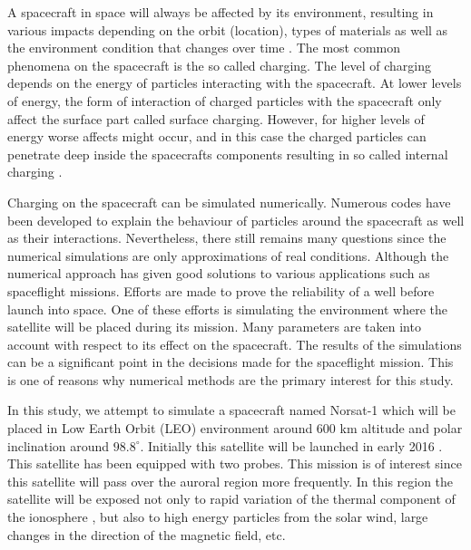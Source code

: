 

A spacecraft in space will always be affected by its environment, resulting in various
impacts depending on the orbit (location), types of materials as well as the environment
condition that changes over time \citep{trove.nla.gov.au/work/21680840}. The  most common phenomena on the spacecraft is the so
called charging. The level of charging depends on the energy of particles interacting with
the spacecraft. At lower levels of energy, the form of interaction of charged particles with the
spacecraft only affect the surface part called surface charging. However, for higher levels of energy
worse affects might occur, and in this case the charged particles
can penetrate deep inside the spacecrafts components resulting in so called internal charging \citep{fennell2001spacecraft}.

Charging on the spacecraft can be simulated numerically. Numerous codes have been developed
to explain the behaviour of particles around the spacecraft as well as their interactions.
Nevertheless, there still remains many questions since the numerical simulations are only approximations
of real conditions. Although the numerical approach has given good solutions to various applications
such as spaceflight missions. Efforts are made to prove the reliability of a well before launch into space.
One of these efforts is simulating the environment where the satellite will be placed during its mission.
Many parameters are taken into account with respect to its effect on the spacecraft.
The results of the simulations can be a significant point in the decisions made for the spaceflight
mission. This is one of reasons why numerical methods are the primary interest for this study.

In this study, we attempt to simulate a spacecraft named Norsat-1 which will be placed in
Low Earth Orbit (LEO) environment around 600 km altitude and polar inclination around \(98.8^\circ\).
Initially this satellite will be launched in early 2016
\citep{norSat}. This satellite
has been equipped with two probes. This mission is of interest since this satellite will pass over
the auroral region more frequently. In this region the satellite will be exposed not only to
rapid variation of the thermal component of the ionosphere \citep{hastings1995review}, but also to high
energy particles from the solar wind, large changes in the direction of the magnetic field, etc.

